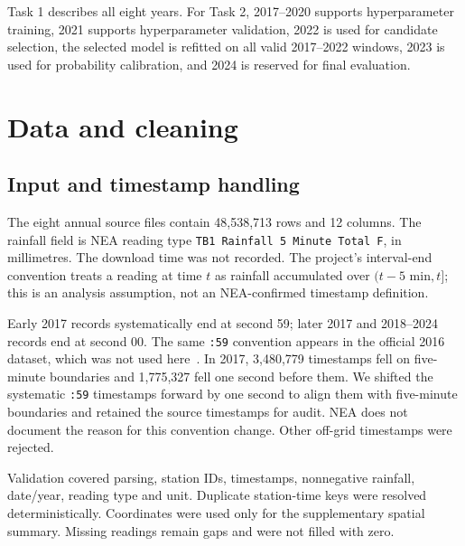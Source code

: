 \documentclass[11pt,a4paper]{article}
\begin{document}
Task 1 describes all eight years. For Task 2, 2017--2020 supports hyperparameter
training, 2021 supports hyperparameter validation, 2022 is used for candidate
selection, the selected model is refitted on all valid 2017--2022 windows, 2023
is used for probability calibration, and 2024 is reserved for final evaluation.

\section{Data and cleaning}
\subsection{Input and timestamp handling}
The eight annual source files contain 48,538,713 rows and 12 columns. The
rainfall field
is NEA reading type \texttt{TB1 Rainfall 5 Minute Total F}, in millimetres. The
download time was not recorded. The project's
interval-end convention treats a reading at time $t$ as rainfall accumulated
over $(t-5\text{ min},t]$; this is an analysis assumption, not an NEA-confirmed
timestamp definition.

Early 2017 records systematically end at second 59; later 2017 and 2018--2024
records end at second 00. The same \texttt{:59} convention appears in the
official 2016 dataset, which was not used here~\cite{nea}. In 2017, 3,480,779
timestamps fell on five-minute boundaries and 1,775,327 fell one second before
them. We shifted the systematic \texttt{:59} timestamps forward by one second
to align them with five-minute boundaries and retained the source timestamps
for audit. NEA does not document the reason for this convention change. Other
off-grid timestamps were rejected.

Validation covered parsing, station IDs, timestamps, nonnegative rainfall,
date/year, reading type and unit. Duplicate station-time keys were resolved
deterministically. Coordinates were used only for the supplementary spatial
summary. Missing readings remain gaps and were not filled with zero.
\end{document}
